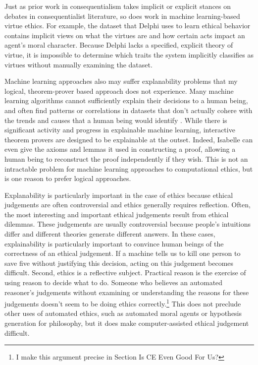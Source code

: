 \begin{isabellebody}
\begin{isamarkuptext}
Just as prior work in consequentialism takes implicit or explicit stances on debates in consequentialist
literature, so does work in machine learning-based virtue ethics. For example, the dataset that Delphi uses to learn ethical
behavior contains implicit views on what the virtues are and how certain acts impact an agent's
moral character. Because Delphi lacks a specified, explicit theory of virtue, it is impossible to 
determine which traits the system implicitly classifies as virtues without manually examining the 
dataset. 

Machine learning approaches also may suffer explanability problems that my logical, theorem-prover
based approach does not experience. Many machine learning algorithms cannot sufficiently explain their 
decisions to a human being, and often find patterns or correlations in datasets that don't actually 
cohere with the trends and causes that a human being would identify \cite{puiutta}. While there is significant activity 
and progress in explainable machine learning, interactive theorem provers are designed to be explainable 
at the outset. Indeed, Isabelle can even give the axioms and lemmas it used in constructing a proof, 
allowing a human being to reconstruct the proof independently if they wish. This is not an 
intractable problem for machine learning approaches to computational ethics, but is one reason to 
prefer logical approaches.

Explanability is particularly important in the case of ethics because ethical judgements are often 
controversial and ethics generally requires reflection. Often, the most interesting and important
ethical judgements result from ethical dilemmas. These judgements are usually controversial 
because people's intuitions differ and different theories generate different answers. In these cases,
explainability is particularly important to convince human beings of the correctness of an ethical 
judgement. If a machine tells us to kill one person to save five without justifying this decision, 
acting on this judgement becomes difficult. Second, ethics is a reflective subject. Practical reason 
is the exercise of using reason to decide what to do. Someone who believes an automated reasoner's 
judgements without examining or understanding the reasons for these judgements doesn't seem to be 
doing ethics correctly.\footnote{I make this argument precise in Section Is CE Even Good For Us?} 
This does not preclude other uses of automated ethics, such as automated moral agents or hypothesis 
generation for philosophy, but it does make computer-assisted ethical judgement difficult.%
\end{isamarkuptext}\isamarkuptrue%
%
\isadelimtheory
%
\endisadelimtheory
%
\isatagtheory
%
\endisatagtheory
{\isafoldtheory}%
%
\isadelimtheory
%
\endisadelimtheory
%
\end{isabellebody}%
